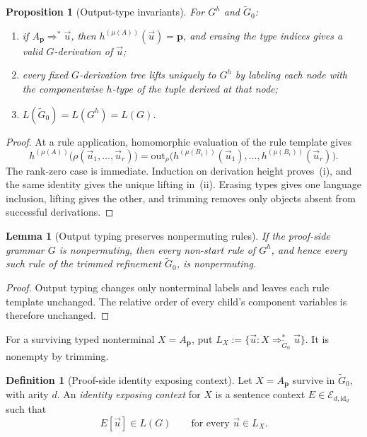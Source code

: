 \documentclass[11pt,a4paper]{article}
\numberwithin{equation}{section}
\theoremstyle{plain}
\newtheorem{lemma}[theorem]{Lemma}
\newtheorem{proposition}[theorem]{Proposition}
\theoremstyle{definition}
\newtheorem{definition}[theorem]{Definition}
\theoremstyle{remark}
\newcommand{\out}{\mathrm{out}}
\newcommand{\tuple}[1]{\vec{#1}}
\begin{document}
\begin{proposition}[Output-type invariants]
\label{prop:output-invariants}
For \(G^h\) and \(\widetilde G_0\):
\begin{enumerate}[label=(\roman*),leftmargin=*]
\item if \(A_{\mathbf p}\Rightarrow^*\tuple u\), then
\(h^{(\mu(A))}(\tuple u)=\mathbf p\), and erasing the type indices gives a
valid \(G\)-derivation of \(\tuple u\);
\item every fixed \(G\)-derivation tree lifts uniquely to \(G^h\) by labeling
each node with the componentwise \(h\)-type of the tuple derived at that node;
\item \(L(\widetilde G_0)=L(G^h)=L(G)\).
\end{enumerate}
\end{proposition}

\begin{proof}
At a rule application, homomorphic evaluation of the rule template gives
\[
  h^{(\mu(A))}
  \bigl(\rho(\tuple u_1,\ldots,\tuple u_r)\bigr)
  =
  \out_\rho
  \bigl(h^{(\mu(B_1))}(\tuple u_1),\ldots,
        h^{(\mu(B_r))}(\tuple u_r)\bigr).
\]
The rank-zero case is immediate.  Induction on derivation height proves~(i),
and the same identity gives the unique lifting in~(ii).  Erasing types gives
one language inclusion, lifting gives the other, and trimming removes only
objects absent from successful derivations.
\end{proof}

\begin{lemma}[Output typing preserves nonpermuting rules]
\label{lem:refinement-nonpermuting}
If the proof-side grammar \(G\) is nonpermuting, then every non-start rule of
\(G^h\), and hence every such rule of the trimmed refinement
\(\widetilde G_0\), is nonpermuting.
\end{lemma}

\begin{proof}
Output typing changes only nonterminal labels and leaves each rule template
unchanged.  The relative order of every child's component variables is
therefore unchanged.
\end{proof}

For a surviving typed nonterminal \(X=A_{\mathbf p}\), put
\(L_X:=\{\tuple u:X\Rightarrow_{\widetilde G_0}^*\tuple u\}\).
It is nonempty by trimming.

\begin{definition}[Proof-side identity exposing context]
\label{def:identity-exposing-context}
Let \(X=A_{\mathbf p}\) survive in \(\widetilde G_0\), with arity \(d\).
An \emph{identity exposing context} for \(X\) is a sentence context
\(E\in\mathcal E_{d,\mathrm{id}_d}\) such that
\[
  E[\tuple u]\in L(G)
  \qquad\text{for every }\tuple u\in L_X.
\]
\end{definition}
\end{document}
